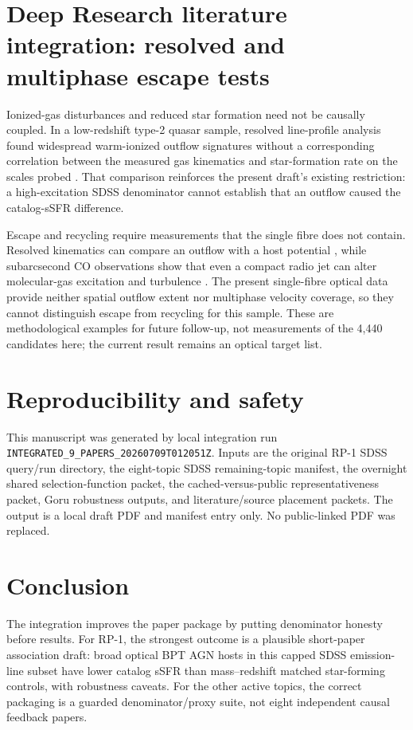 \documentclass[twocolumn]{aastex702}
\begin{document}
\section{Deep Research literature integration: resolved and multiphase escape tests}\label{sec:dr-r1}
Ionized-gas disturbances and reduced star formation need not be causally coupled. In a low-redshift type-2 quasar sample, resolved line-profile analysis found widespread warm-ionized outflow signatures without a corresponding correlation between the measured gas kinematics and star-formation rate on the scales probed \citep{bessiere2024}. That comparison reinforces the present draft's existing restriction: a high-excitation SDSS denominator cannot establish that an outflow caused the catalog-sSFR difference.

Escape and recycling require measurements that the single fibre does not contain. Resolved kinematics can compare an outflow with a host potential \citep{zheng2023}, while subarcsecond CO observations show that even a compact radio jet can alter molecular-gas excitation and turbulence \citep{audibert2023}. The present single-fibre optical data provide neither spatial outflow extent nor multiphase velocity coverage, so they cannot distinguish escape from recycling for this sample. These are methodological examples for future follow-up, not measurements of the 4,440 candidates here; the current result remains an optical target list.

\section{Reproducibility and safety}\label{sec:repro}
This manuscript was generated by local integration run \texttt{INTEGRATED\_9\_PAPERS\_20260709T012051Z}. Inputs are the original RP-1 SDSS query/run directory, the eight-topic SDSS remaining-topic manifest, the overnight shared selection-function packet, the cached-versus-public representativeness packet, Goru robustness outputs, and literature/source placement packets. The output is a local draft PDF and manifest entry only. No public-linked PDF was replaced.

\section{Conclusion}\label{sec:conclusion}
The integration improves the paper package by putting denominator honesty before results. For RP-1, the strongest outcome is a plausible short-paper association draft: broad optical BPT AGN hosts in this capped SDSS emission-line subset have lower catalog sSFR than mass--redshift matched star-forming controls, with robustness caveats. For the other active topics, the correct packaging is a guarded denominator/proxy suite, not eight independent causal feedback papers.
\end{document}
